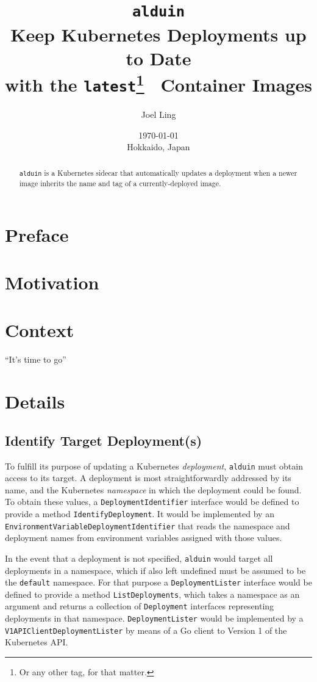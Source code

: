 \documentclass{article}
\title{\texttt{alduin} \\
    \large Keep Kubernetes Deployments up to Date \\
    with the \texttt{latest}\footnote{
        Or any other tag, for that matter.
    } \
    Container Images
}
\author{Joel Ling}
\date{\today \\
    \small Hokkaido, Japan
}
\begin{document}
\maketitle

\begin{abstract}
\texttt{alduin} is a Kubernetes sidecar
that automatically updates a deployment
when a newer image inherits the name and tag
of a currently-deployed image.
\end{abstract}

\tableofcontents

\section{Preface}

\section{Motivation}

\section{Context}
``It's time to go''

\pagebreak

\section{Details}

\subsection{Identify Target Deployment(s)}
To fulfill its purpose of updating a Kubernetes \textit{deployment},
\texttt{alduin} must obtain access to its target.
A deployment is most straightforwardly addressed by its name,
and the Kubernetes \textit{namespace} in which the deployment could be found.
To obtain these values,
a \texttt{DeploymentIdentifier} interface would be defined
to provide a method \texttt{IdentifyDeployment}.
It would be implemented by an \texttt{EnvironmentVariableDeploymentIdentifier}
that reads the namespace and deployment names from environment variables
assigned with those values.

In the event that a deployment is not specified,
\texttt{alduin} would target all deployments in a namespace,
which if also left undefined
must be assumed to be the \texttt{default} namespace.
For that purpose a \texttt{DeploymentLister} interface would be defined
to provide a method \texttt{ListDeployments},
which takes a namespace as an argument and
returns a collection of \texttt{Deployment} interfaces
representing deployments in that namespace.
\texttt{DeploymentLister} would be implemented
by a \texttt{V1APIClientDeploymentLister}
by means of a Go client to Version 1 of the Kubernetes API.
\end{document}
